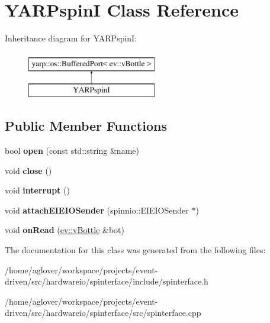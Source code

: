 \hypertarget{classYARPspinI}{}\section{Y\+A\+R\+PspinI Class Reference}
\label{classYARPspinI}
Inheritance diagram for Y\+A\+R\+PspinI\+:\begin{figure}[H]
\begin{center}
\leavevmode
\includegraphics[height=2.000000cm]{classYARPspinI}
\end{center}
\end{figure}
\subsection*{Public Member Functions}
\begin{DoxyCompactItemize}
\item 
bool {\bfseries open} (const std\+::string \&name)\hypertarget{classYARPspinI_a749cd07632d7e3cd08846457e2d6be2e}{}\label{classYARPspinI_a749cd07632d7e3cd08846457e2d6be2e}

\item 
void {\bfseries close} ()\hypertarget{classYARPspinI_a6955f4744c185dd870b32ad17ddd75ef}{}\label{classYARPspinI_a6955f4744c185dd870b32ad17ddd75ef}

\item 
void {\bfseries interrupt} ()\hypertarget{classYARPspinI_a9340f1b20136adad3392c155393506ac}{}\label{classYARPspinI_a9340f1b20136adad3392c155393506ac}

\item 
void {\bfseries attach\+E\+I\+E\+I\+O\+Sender} (spinnio\+::\+E\+I\+E\+I\+O\+Sender $\ast$)\hypertarget{classYARPspinI_a6480c2630a974de7af8501ef2e2b9068}{}\label{classYARPspinI_a6480c2630a974de7af8501ef2e2b9068}

\item 
void {\bfseries on\+Read} (\hyperlink{classev_1_1vBottle}{ev\+::v\+Bottle} \&bot)\hypertarget{classYARPspinI_af965467765329a090b8e5153b1f01112}{}\label{classYARPspinI_af965467765329a090b8e5153b1f01112}

\end{DoxyCompactItemize}


The documentation for this class was generated from the following files\+:\begin{DoxyCompactItemize}
\item 
/home/aglover/workspace/projects/event-\/driven/src/hardwareio/spinterface/include/spinterface.\+h\item 
/home/aglover/workspace/projects/event-\/driven/src/hardwareio/spinterface/src/spinterface.\+cpp\end{DoxyCompactItemize}
